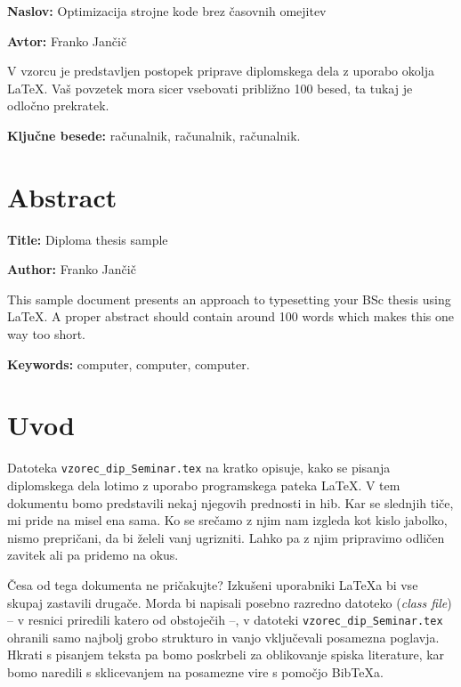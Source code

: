 \documentclass[a4paper, 12pt]{book}
\newcommand{\ttitle}{Optimizacija strojne kode brez časovnih omejitev}
\newcommand{\ttitleEn}{Diploma thesis sample}
\newcommand{\tauthor}{Franko Jančič}
\newcommand{\tkeywords}{računalnik, računalnik, računalnik}
\newcommand{\tkeywordsEn}{computer, computer, computer}
\newcommand{\BibTeX}{{\sc Bib}\TeX}
\newcommand{\clearemptydoublepage}{\newpage{\pagestyle{empty}\cleardoublepage}}
\begin{document}
\noindent\textbf{Naslov:} \ttitle
\bigskip

\noindent\textbf{Avtor:} \tauthor
\bigskip

\noindent V vzorcu je predstavljen postopek priprave diplomskega dela z uporabo okolja \LaTeX. Vaš povzetek mora sicer vsebovati približno 100 besed, ta tukaj je odločno prekratek.
\bigskip

\noindent\textbf{Ključne besede:} \tkeywords.
\clearemptydoublepage

\chapter*{Abstract}

\noindent\textbf{Title:} \ttitleEn
\bigskip

\noindent\textbf{Author:} \tauthor
\bigskip

\noindent This sample document presents an approach to typesetting your BSc thesis using \LaTeX. 
A proper abstract should contain around 100 words which makes this one way too short.
\bigskip

\noindent\textbf{Keywords:} \tkeywordsEn.
\clearemptydoublepage

\mainmatter
\setcounter{page}{1}
\pagestyle{fancy}

\chapter{Uvod}
Datoteka {\tt vzorec\_dip\_Seminar.tex} na kratko opisuje, kako se pisanja diplomskega dela lotimo z uporabo programskega pateka \LaTeX. 
V tem dokumentu bomo predstavili nekaj njegovih prednosti in hib. Kar se slednjih tiče, mi pride na misel ena sama. 
Ko se srečamo z njim nam izgleda kot kislo jabolko, nismo prepričani, da bi želeli vanj ugrizniti. 
Lahko pa z njim pripravimo odličen zavitek ali pa pridemo na okus.

Česa od tega dokumenta ne pričakujte? Izkušeni uporabniki \LaTeX{a} bi vse skupaj zastavili drugače. 
Morda bi napisali posebno razredno datoteko (\emph{class file}) -- v resnici priredili katero od obstoječih --, v datoteki {\tt vzorec\_dip\_Seminar.tex} ohranili samo najbolj grobo strukturo in vanjo vključevali  posamezna po\-glav\-ja. 
Hkrati s pisanjem teksta pa bomo poskrbeli za oblikovanje spiska literature, kar bomo naredili s sklicevanjem na posamezne vire s pomočjo {\BibTeX}{a}. 
\end{document}
